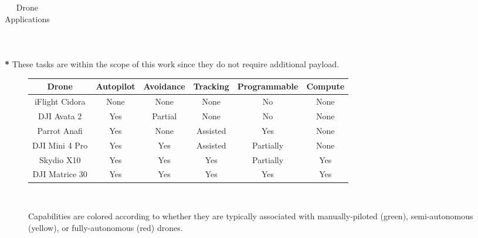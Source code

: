 \begin{table}
\begin{tabularx}{\textwidth}{| m{2.8cm} | m{12.5cm} |}
        \hline
    \end{tabularx}
    \\[0.2cm]
    \begin{captext}
        \small
        \textbf{*} These tasks are within the scope of this work since they do not require additional payload.
    \end{captext}
    \caption{Drone Applications}
    \label{tab:drone-apps}
\end{table}

\begin{figure}[]
    \centering
    \begin{tabular}{|c|c|c|c|c|c|}
        \hline
           \rowcolor{lightgray!50}
         \textbf{Drone} & \textbf{Autopilot} & \textbf{Avoidance} & \textbf{Tracking} & \textbf{Programmable} & \textbf{Compute} \\
         \hline
         iFlight Cidora & \cellcolor{green!20}None & \cellcolor{green!20}None & \cellcolor{green!20}None & \cellcolor{green!20}No & \cellcolor{green!20}None \\[0.1cm]
         \hline
         DJI Avata 2 & \cellcolor{red!20}Yes & \cellcolor{yellow!20}Partial & \cellcolor{green!20}None & \cellcolor{green!20}No & \cellcolor{green!20}None \\[0.1cm]
         \hline
         Parrot Anafi & \cellcolor{red!20}Yes & \cellcolor{green!20}None & \cellcolor{yellow!20}Assisted & \cellcolor{red!20}Yes & \cellcolor{green!20}None \\[0.1cm]
         \hline
         DJI Mini 4 Pro & \cellcolor{red!20}Yes & \cellcolor{red!20}Yes & \cellcolor{yellow!20}Assisted & \cellcolor{yellow!20}Partially & \cellcolor{green!20}None \\[0.1cm]
         \hline
         Skydio X10 & \cellcolor{red!20}Yes & \cellcolor{red!20}Yes & \cellcolor{red!20}Yes & \cellcolor{yellow!20}Partially & \cellcolor{red!20}Yes \\[0.1cm]
         \hline
         DJI Matrice 30 & \cellcolor{red!20}Yes & \cellcolor{red!20}Yes & \cellcolor{red!20}Yes & \cellcolor{red!20}Yes & \cellcolor{red!20}Yes \\[0.1cm]
         \hline
    \end{tabular}
    \\[0.2cm]
    \begin{captext}
        \small Capabilities are colored according to whether they are typically associated with manually-piloted (green), semi-autonomous (yellow), or fully-autonomous (red) drones.
    \end{captext}

\end{figure}
